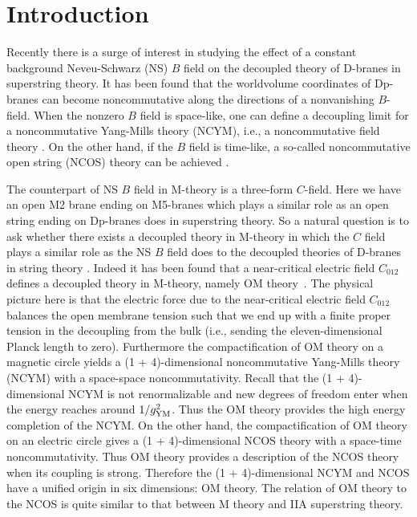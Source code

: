 \documentclass[a4paper,12pt]{article}
\newcommand{\sect}[1]{\setcounter{equation}{0}\section{#1}}
\begin{document}
\newpage
\renewcommand{\thefootnote}{\arabic{footnote}}
\setcounter{footnote}{0}
\setcounter{page}{2}


\sect{Introduction}
Recently there is a surge of interest in studying the effect of a
constant background Neveu-Schwarz (NS)  $B$
field on the decoupled theory of D-branes in superstring theory.
 It has been found that the worldvolume
coordinates of Dp-branes can become noncommutative along the directions
of a nonvanishing  $B$-field.
When the nonzero $B$ field is space-like, one can define a decoupling
limit for a noncommutative Yang-Mills theory (NCYM), i.e., a
noncommutative field theory \cite{SW}. On the other hand, 
if the $B$ field is time-like, a so-called noncommutative open string
(NCOS) theory can be 
achieved \cite{SST,Gop1}.

   
The counterpart of NS $B$ field in M-theory is a three-form  $C$-field.
Here we have an open M2 brane ending on M5-branes which plays a similar
role as an open string ending on Dp-branes does in superstring 
theory. So a natural question is to ask whether there exists a decoupled
theory in M-theory in which the $C$ field plays 
a similar role as the NS $B$ field does to the decoupled theories of
D-branes in string theory \cite{SW,CHL,Chak,Berg,Kawa,Berm}. 
 Indeed it has been found that a near-critical electric field $C_{012}$
defines a decoupled theory in M-theory, namely OM theory~\cite{Gop2,
Berg2}. The physical picture here is that the electric force due to 
the near-critical electric field $C_{012}$ balances the open membrane tension
such that we end up with a finite proper tension in the decoupling from
the bulk (i.e., sending the eleven-dimensional Planck length to zero).
 Furthermore the compactification of 
OM theory on a magnetic circle yields a (1 + 4)-dimensional
noncommutative Yang-Mills theory (NCYM) with a space-space noncommutativity.
Recall that the (1 + 4)-dimensional NCYM is not renormalizable and 
new degrees of freedom enter when the energy
reaches around $1/g^2_{\rm YM}$. Thus the OM 
theory provides the high energy completion of the NCYM.  On the 
other hand, the compactification of OM theory on an electric circle
gives a (1 + 4)-dimensional NCOS
theory with a space-time noncommutativity.
Thus OM theory provides a description of the NCOS theory when its
coupling is strong.
Therefore the (1 + 4)-dimensional NCYM and NCOS have a unified origin in six 
dimensions: OM theory.  The relation of OM theory to the NCOS is quite 
similar to that between  M theory and IIA superstring theory.    
\end{document}
